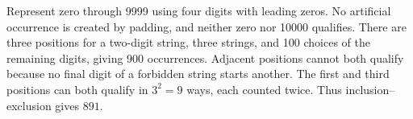Represent zero through 9999 using four digits with leading zeros. No artificial occurrence is created by padding, and neither zero nor 10000 qualifies. There are three positions for a two-digit string, three strings, and 100 choices of the remaining digits, giving 900 occurrences. Adjacent positions cannot both qualify because no final digit of a forbidden string starts another. The first and third positions can both qualify in $3^2=9$ ways, each counted twice. Thus inclusion--exclusion gives $\boxed{891}$.
